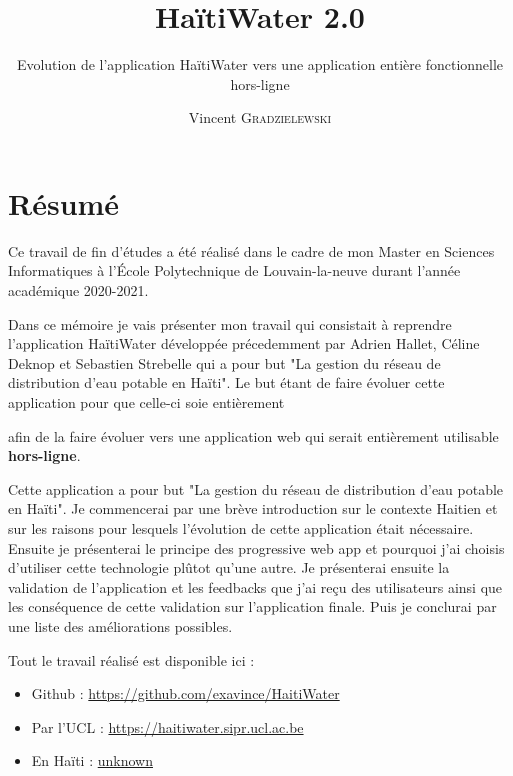\documentclass{EPL-master-thesis-covers-FR}
\title{HaïtiWater 2.0}
\subtitle{Evolution de l'application HaïtiWater vers une application entière  fonctionnelle hors-ligne}
\author{Vincent \textsc{Gradzielewski}}%
\begin{document}
	\maketitle
	\tableofcontents

	\setlength{\parskip}{1.5em plus1em minus1em}


	\chapter*{Résumé}
	
	
		Ce travail de fin d'études a été réalisé dans le cadre de mon Master en Sciences Informatiques à l'École Polytechnique de Louvain-la-neuve durant l'année académique 2020-2021.
		
		Dans ce mémoire je vais présenter mon travail qui consistait à reprendre l'application HaïtiWater développée précedemment par Adrien Hallet, Céline Deknop et Sebastien Strebelle qui a pour but "La gestion du réseau de distribution d'eau potable en Haïti". Le but étant de faire évoluer cette application pour que celle-ci soie entièrement
		
		
		 afin de la faire évoluer vers une application web qui serait entièrement utilisable \textbf{hors-ligne}.
		 
		Cette application a pour but "La gestion du réseau de distribution d'eau potable en Haïti". Je commencerai par une brève introduction sur le contexte Haitien et sur les raisons pour lesquels l'évolution de cette application était nécessaire. Ensuite je présenterai le principe des progressive web app et pourquoi j'ai choisis d'utiliser cette technologie plûtot qu'une autre. Je présenterai ensuite la validation de l'application et les feedbacks que j'ai reçu des utilisateurs ainsi que les conséquence de cette validation sur l'application finale. Puis je conclurai par une liste des améliorations possibles.

		Tout le travail réalisé est disponible ici :

\begin{itemize}
	\item Github : \url{https://github.com/exavince/HaitiWater}
	\item Par l'UCL : \url{https://haitiwater.sipr.ucl.ac.be}
	\item En Haïti : \url{unknown}
\end{itemize}		
\end{document}
